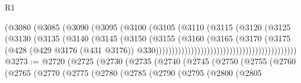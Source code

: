 \begin{lexlean}{R1}
\begin{coremodule}
                                                  (@3080
                                                    (@3085
                                                      (@3090
                                                        (@3095
                                                          (@3100
                                                            (@3105
                                                              (@3110
                                                                (@3115
                                                                  (@3120
                                                                    (@3125
                                                                      (@3130
                                                                        (@3135
                                                                          (@3140
                                                                            (@3145
                                                                              (@3150
                                                                                (@3155
                                                                                  (@3160
                                                                                    (@3165
                                                                                      (@3170
                                                                                        (@3175
                                                                                          (@428
                                                                                            (@429
                                                                                              @3176
                                                                                              (@431
                                                                                                @3176))
                                                                                            @330))))))))))))))))))))))))))))))))))))))))))))
@3273 := @2720
    (@2725
      (@2730
        (@2735
          (@2740
            (@2745
              (@2750
                (@2755
                  (@2760
                    (@2765
                      (@2770
                        (@2775
                          (@2780
                            (@2785
                              (@2790
                                (@2795
                                  (@2800
                                    (@2805

\end{coremodule}
\end{lexlean}
